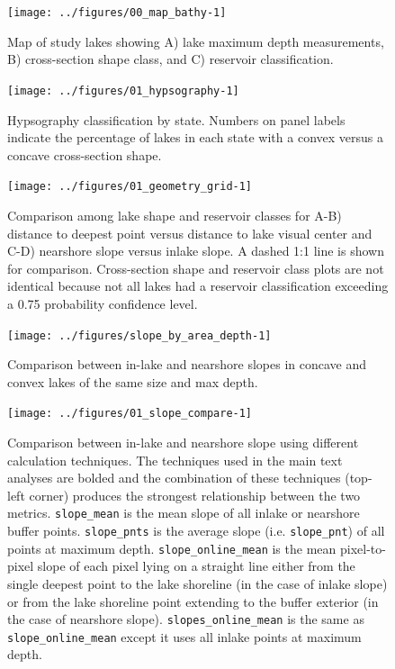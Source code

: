 \documentclass[draft,wrr]{agutexSI2019}
\begin{document}
\clearpage

\begin{figure}
      \begin{center}\texttt{[image: ../figures/00\_map\_bathy-1]}\end{center}
      \caption{Map of study lakes showing A) lake maximum depth measurements, B) cross-section shape class, and C) reservoir classification.}\label{figS2}
      \end{figure}

\begin{figure}
      \noindent\texttt{[image: ../figures/01\_hypsography-1]}
      \caption{Hypsography classification by state. Numbers on panel labels indicate the percentage of lakes in each state with a convex versus a concave cross-section shape.}\label{figS3}
      \end{figure}

\begin{figure}
      \noindent\texttt{[image: ../figures/01\_geometry\_grid-1]}
      \caption{Comparison among lake shape and reservoir classes for A-B) distance to deepest point versus distance to lake visual center and C-D) nearshore slope versus inlake slope. A dashed 1:1 line is shown for comparison. Cross-section shape and reservoir class plots are not identical because not all lakes had a reservoir classification exceeding a 0.75 probability confidence level.}\label{figS4}
      \end{figure}

\begin{figure}
      \begin{center}
        \texttt{[image: ../figures/slope\_by\_area\_depth-1]}
      \end{center}
      \caption{Comparison between in-lake and nearshore slopes in concave and convex lakes of the same size and max depth.}\label{figS5}
    \end{figure}
\clearpage

\begin{figure}
      \begin{center}
        \texttt{[image: ../figures/01\_slope\_compare-1]}
      \end{center}
      \caption{Comparison between in-lake and nearshore slope using different calculation techniques. The techniques used in the main text analyses are bolded and the combination of these techniques (top-left corner) produces the strongest relationship between the two metrics. \texttt{slope\_mean} is the mean slope of all inlake or nearshore buffer points. \texttt{slope\_pnts} is the average slope (i.e. \texttt{slope\_pnt}) of all points at maximum depth. \texttt{slope\_online\_mean} is the mean pixel-to-pixel slope of each pixel lying on a straight line either from the single deepest point to the lake shoreline (in the case of inlake slope) or from the lake shoreline point extending to the buffer exterior (in the case of nearshore slope). \texttt{slopes\_online\_mean} is the same as \texttt{slope\_online\_mean} except it uses all inlake points at maximum depth.}\label{figS6}
    \end{figure}
\clearpage
\end{document}
